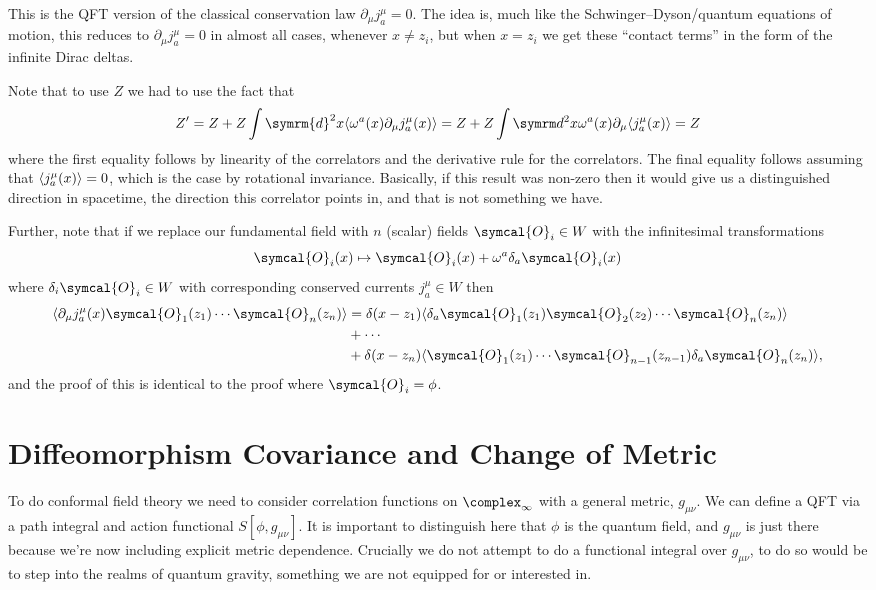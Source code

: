 \documentclass[fleqn]{NotesClass}
\renewcommand{\dl}[1]{\symrm{d}#1}
\newcommand{\quantumField}[1]{\symcal{#1}}
\DeclarePairedDelimiter{\correlator}{\langle}{\rangle}
\begin{document}
    This is the QFT version of the classical conservation law \(\partial_\mu j^\mu_a = 0\).
    The idea is, much like the Schwinger--Dyson/quantum equations of motion, this reduces to \(\partial_\mu j^\mu_a = 0\) in almost all cases, whenever \(x \ne z_i\), but when \(x = z_i\) we get these \enquote{contact terms} in the form of the infinite Dirac deltas.
    
    Note that to use \(Z\) we had to use the fact that
    \begin{equation}
        Z' = Z + Z \int \dl{^2x} \correlator{\omega^a(x) \partial_\mu j^\mu_a(x)} = Z + Z\int \dl^2x \omega^a(x) \partial_\mu \correlator{j^\mu_a(x)} = Z
    \end{equation}
    where the first equality follows by linearity of the correlators and the derivative rule for the correlators.
    The final equality follows assuming that \(\correlator{j^\mu_a(x)} = 0\), which is the case by rotational invariance.
    Basically, if this result was non-zero then it would give us a distinguished direction in spacetime, the direction this correlator points in, and that is not something we have.
    
    Further, note that if we replace our fundamental field with \(n\) (scalar) fields \(\quantumField{O}_i \in W\) with the infinitesimal transformations
    \begin{equation}
        \quantumField{O}_i(x) \mapsto \quantumField{O}_i(x) + \omega^a \delta_a\quantumField{O}_i(x)
    \end{equation}
    where \(\delta_i\quantumField{O}_i \in W\) with corresponding conserved currents \(j^\mu_a \in W\) then
    \begin{align}
        \correlator{\partial_\mu j^\mu_a(x) \quantumField{O}_1(z_1) \dotsm \quantumField{O}_n(z_n)} &= \delta(x - z_1) \correlator{\delta_a\quantumField{O}_1(z_1)\quantumField{O}_2(z_2) \dotsm \quantumField{O}_n(z_n)}\\
        &+ \dotsb \notag\\
        &+ \delta(x - z_n)\correlator{\quantumField{O}_1(z_1) \dotsm \quantumField{O}_{n-1}(z_{n-1}) \delta_a\quantumField{O}_n(z_n)}, \notag
    \end{align}
    and the proof of this is identical to the proof where \(\quantumField{O}_i = \phi\).
    
    \section{Diffeomorphism Covariance and Change of Metric}
    To do conformal field theory we need to consider correlation functions on \(\complex_{\infty}\) with a general metric, \(g_{\mu\nu}\).
    We can define a QFT via a path integral and action functional \(S[\phi, g_{\mu\nu}]\).
    It is important to distinguish here that \(\phi\) is the quantum field, and \(g_{\mu\nu}\) is just there because we're now including explicit metric dependence.
    Crucially we do not attempt to do a functional integral over \(g_{\mu\nu}\), to do so would be to step into the realms of quantum gravity, something we are not equipped for or interested in.
    
\end{document}
